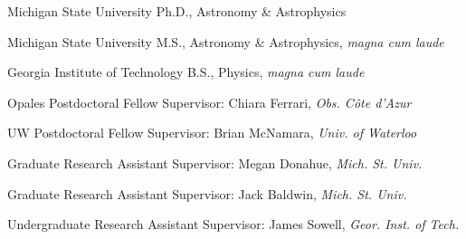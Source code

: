 \documentclass[11pt]{cv}
\begin{document}
\begin{llist}


Michigan State University
Ph.D., Astronomy \& Astrophysics

Michigan State University
M.S., Astronomy \& Astrophysics, \textit{magna cum laude}

Georgia Institute of Technology
B.S., Physics, \textit{magna cum laude}


Opales Postdoctoral Fellow
Supervisor: Chiara Ferrari, {\textit{Obs. C\^ote d'Azur}}

UW Postdoctoral Fellow
Supervisor: Brian McNamara, {\textit{Univ. of Waterloo}}

Graduate Research Assistant
Supervisor: Megan Donahue, {\textit{Mich. St. Univ.}}

Graduate Research Assistant
Supervisor: Jack Baldwin, {\textit{Mich. St. Univ.}}

Undergraduate Research Assistant
Supervisor: James Sowell, {\textit{Geor. Inst. of Tech.}}




\end{llist}
\end{document}
